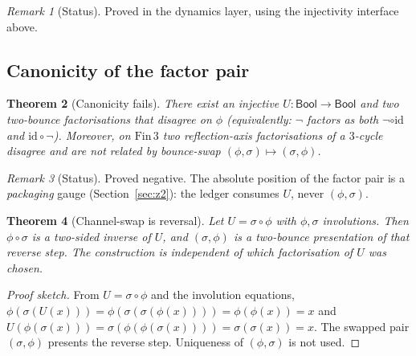 \documentclass[11pt,a4paper]{article}
\theoremstyle{plain}
\newtheorem{theorem}{Theorem}[section]
\theoremstyle{definition}
\theoremstyle{remark}
\newtheorem{remark}[theorem]{Remark}
\newcommand{\Bool}{\mathsf{Bool}}
\newcommand{\comp}{\circ}
\begin{document}
\begin{remark}[Status]
Proved in the dynamics layer, using the injectivity interface above.
\end{remark}

\subsection{Canonicity of the factor pair}

\begin{theorem}[Canonicity fails]
\label{thm:canonfail}
There exist an injective $U:\Bool\to\Bool$ and two two-bounce
factorisations that disagree on $\phi$ (equivalently: $\neg$ factors as
both $\neg\comp\mathrm{id}$ and $\mathrm{id}\comp\neg$).
Moreover, on $\mathrm{Fin}\,3$ two reflection-axis factorisations of a
$3$-cycle disagree and are not related by bounce-swap
$(\phi,\sigma)\mapsto(\sigma,\phi)$.
\end{theorem}

\begin{remark}[Status]
Proved negative. The absolute position of the factor pair is a
\emph{packaging} gauge (Section~\ref{sec:z2}): the ledger consumes $U$,
never $(\phi,\sigma)$.
\end{remark}

\begin{theorem}[Channel-swap is reversal]
\label{thm:swap}
Let $U=\sigma\comp\phi$ with $\phi,\sigma$ involutions. Then
$\phi\comp\sigma$ is a two-sided inverse of $U$, and $(\sigma,\phi)$ is
a two-bounce presentation of that reverse step. The construction is
independent of which factorisation of $U$ was chosen.
\end{theorem}

\begin{proof}[Proof sketch]
From $U=\sigma\comp\phi$ and the involution equations,
$\phi(\sigma(U(x)))=\phi(\sigma(\sigma(\phi(x))))=\phi(\phi(x))=x$ and
$U(\phi(\sigma(x)))=\sigma(\phi(\phi(\sigma(x))))=\sigma(\sigma(x))=x$.
The swapped pair $(\sigma,\phi)$ presents the reverse step. Uniqueness
of $(\phi,\sigma)$ is not used.
\end{proof}
\end{document}
